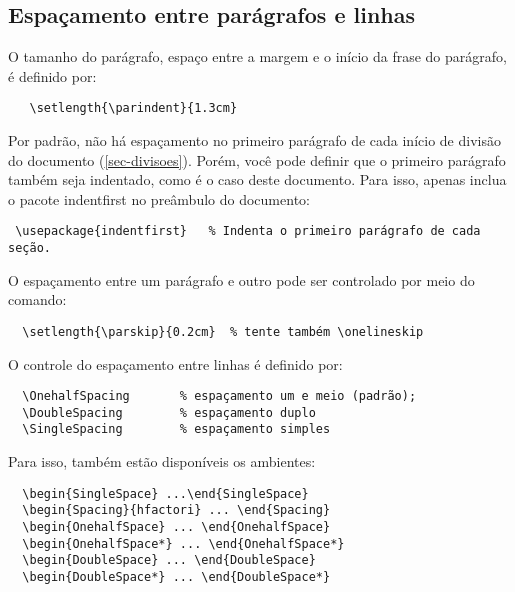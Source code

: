 \documentclass[12pt,oneside,a4paper,chapter=TITLE,
			   english,brazil]{abntex2}
\begin{document}
\begin{anexosenv}
\section{Espaçamento entre parágrafos e linhas}

O tamanho do parágrafo, espaço entre a margem e o início da frase do parágrafo, é definido por:
\begin{verbatim}
   \setlength{\parindent}{1.3cm}
\end{verbatim}

Por padrão, não há espaçamento no primeiro parágrafo de cada início de divisão do documento (\autoref{sec-divisoes}). Porém, você pode definir que o primeiro parágrafo também seja indentado, como é o caso deste documento. Para isso, apenas inclua o pacote \textsf{indentfirst} no preâmbulo do documento:
\begin{verbatim}
 \usepackage{indentfirst}   % Indenta o primeiro parágrafo de cada seção.
\end{verbatim}

O espaçamento entre um parágrafo e outro pode ser controlado por meio do comando:
\begin{verbatim}
  \setlength{\parskip}{0.2cm}  % tente também \onelineskip
\end{verbatim}

O controle do espaçamento entre linhas é definido por:
\begin{verbatim}
  \OnehalfSpacing       % espaçamento um e meio (padrão); 
  \DoubleSpacing        % espaçamento duplo
  \SingleSpacing        % espaçamento simples	
\end{verbatim}

Para isso, também estão disponíveis os ambientes:
\begin{verbatim}
  \begin{SingleSpace} ...\end{SingleSpace}
  \begin{Spacing}{hfactori} ... \end{Spacing}
  \begin{OnehalfSpace} ... \end{OnehalfSpace}
  \begin{OnehalfSpace*} ... \end{OnehalfSpace*}
  \begin{DoubleSpace} ... \end{DoubleSpace}
  \begin{DoubleSpace*} ... \end{DoubleSpace*} 
\end{verbatim}


\end{anexosenv}
\end{document}
